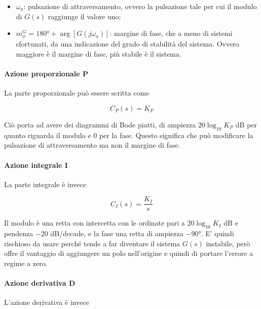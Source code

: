 		\begin{itemize}
			\item $\omega_a$: pulsazione di attraversamento, ovvero la pulsazione tale per cui il modulo di $G(s)$ raggiunge il valore uno;
			\item $m_{\phi}^G=180°+\arg[G(j\omega_a)]$: margine di fase, che a meno di sistemi sfortunati, da una  indicazione del grado di stabilità del sistema. Ovvero maggiore è il margine di fase, più stabile è il sistema.		 
		\end{itemize}
		
		\paragraph{Azione proporzionale P} 
	   	\label{par:P}
	   		\leavevmode\newline
	   		La parte proporzionale può essere scritta come 
	   		
	   		\begin{equation*}
	   			C_P(s)=K_P
	   		\end{equation*}
	   		
	   		\noindent Ciò porta ad avere dei diagrammi di Bode piatti, di ampiezza $20\log_{10}K_P$ dB per quanto riguarda il modulo e 0 per la fase. Questo significa che può modificare la pulsazione di attraversamento ma non il margine di fase.
	   		
	   	\paragraph{Azione integrale I}
	   	\label{par:I}
	   		\leavevmode\newline
	   		La parte integrale è invece
	   		
	   		\begin{equation*}
		   		C_I(s)=\frac{K_I}{s}
	   		\end{equation*}	
	   		
	   		\noindent Il modulo è una retta con intercetta con le ordinate pari a $20\log_{10}K_I$ dB e pendenza $-20$ dB/decade, e la fase una retta di ampiezza $-90°$. E' quindi rischioso da usare perché tende a far diventare il sistema $G(s)$ instabile, però offre il vantaggio di aggiungere un polo nell'origine e quindi di portare l'errore a regime a zero.
	   		
	   	\paragraph{Azione derivativa D}
	   	\label{par:D}
	   		\leavevmode\newline
	   		L'azione derivativa è invece
	   		
